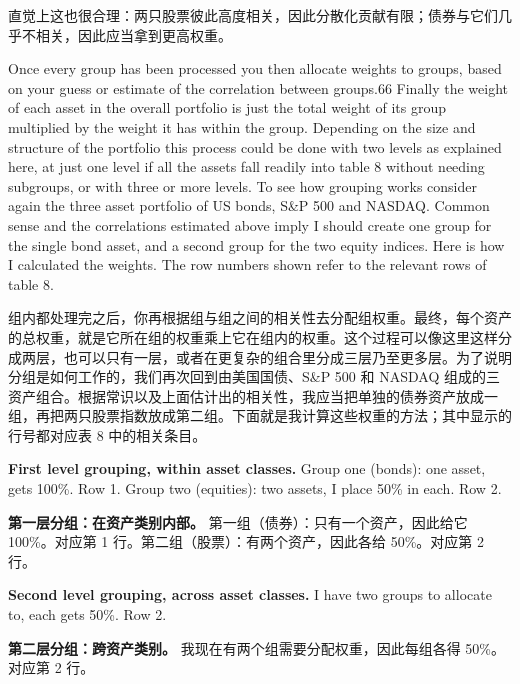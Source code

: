 \begin{chineseblock}直觉上这也很合理：两只股票彼此高度相关，因此分散化贡献有限；债券与它们几乎不相关，因此应当拿到更高权重。\end{chineseblock}

\bipairgap

\begin{englishblock} Once every group has been processed you then allocate weights to groups, based on your guess or estimate of the correlation between groups.66 Finally the weight of each asset in the overall portfolio is just the total weight of its group multiplied by the weight it has within the group. Depending on the size and structure of the portfolio this process could be done with two levels as explained here, at just one level if all the assets fall readily into table 8 without needing subgroups, or with three or more levels. To see how grouping works consider again the three asset portfolio of US bonds, S\&P 500 and NASDAQ. Common sense and the correlations estimated above imply I should create one group for the single bond asset, and a second group for the two equity indices. Here is how I calculated the weights. The row numbers shown refer to the relevant rows of table 8. \end{englishblock}

\begin{chineseblock}组内都处理完之后，你再根据组与组之间的相关性去分配组权重。最终，每个资产的总权重，就是它所在组的权重乘上它在组内的权重。这个过程可以像这里这样分成两层，也可以只有一层，或者在更复杂的组合里分成三层乃至更多层。为了说明分组是如何工作的，我们再次回到由美国国债、S\&P 500 和 NASDAQ 组成的三资产组合。根据常识以及上面估计出的相关性，我应当把单独的债券资产放成一组，再把两只股票指数放成第二组。下面就是我计算这些权重的方法；其中显示的行号都对应表 8 中的相关条目。\end{chineseblock}

\medskip \noindent\textbf{First level grouping, within asset classes.} Group one (bonds): one asset, gets 100\%. Row 1. Group two (equities): two assets, I place 50\% in each. Row 2.

\medskip \noindent\textbf{第一层分组：在资产类别内部。} 第一组（债券）：只有一个资产，因此给它 100\%。对应第 1 行。第二组（股票）：有两个资产，因此各给 50\%。对应第 2 行。

\medskip \noindent\textbf{Second level grouping, across asset classes.} I have two groups to allocate to, each gets 50\%. Row 2.

\medskip \noindent\textbf{第二层分组：跨资产类别。} 我现在有两个组需要分配权重，因此每组各得 50\%。对应第 2 行。

